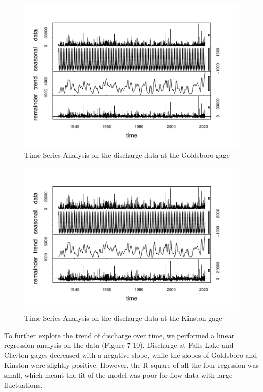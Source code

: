\documentclass[
  12pt,
]{article}
\begin{document}
\begin{figure}

\includegraphics{Gardner_Zeng_ENV872_Project_files/figure-latex/Time series Goldsboro-1} \hfill{}

\caption{Time Series Analysis on the discharge data at the Goldsboro gage}\label{fig:Time series Goldsboro}
\end{figure}

\begin{figure}

\includegraphics{Gardner_Zeng_ENV872_Project_files/figure-latex/Time series Kinston-1} \hfill{}

\caption{Time Series Analysis on the discharge data at the Kinston gage}\label{fig:Time series Kinston}
\end{figure}

To further explore the trend of discharge over time, we performed a
linear regression analysis on the data (Figure 7-10). Discharge at Falls
Lake and Clayton gages decreased with a negative slope, while the slopes
of Goldsboro and Kinston were slightly positive. However, the R square
of all the four regrssion was small, which meant the fit of the model
was poor for flow data with large fluctuations.
\end{document}
